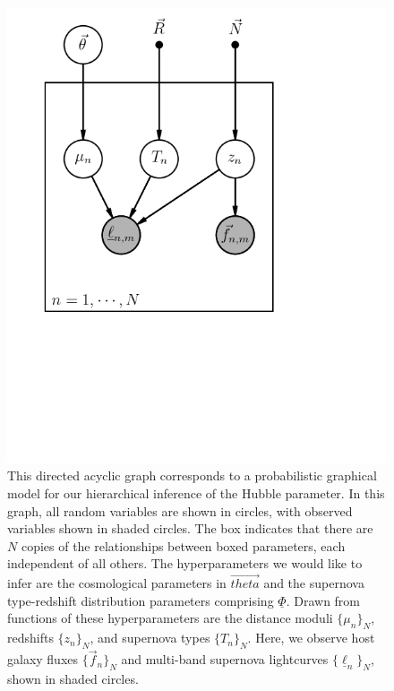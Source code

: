 \documentclass[12pt, onecolumn]{emulateapj}
\newcommand{\textul}{\underline}
\begin{document}
\vspace{1in}
\begin{figure}
\begin{center}
\includegraphics{Hubble-draft.png}
\caption{This directed acyclic graph corresponds to a probabilistic graphical model for our hierarchical inference of the Hubble parameter.  In this graph, all random variables are shown in circles, with observed variables shown in shaded circles.  The box indicates that there are $N$ copies of the relationships between boxed parameters, each independent of all others.  The hyperparameters we would like to infer are the cosmological parameters in $\vec{theta}$ and the supernova type-redshift distribution parameters comprising $\textul{\Phi}$.  Drawn from functions of these hyperparameters are the distance moduli $\{\mu_{n}\}_{N}$, redshifts $\{z_{n}\}_{N}$, and supernova types $\{T_{n}\}_{N}$.  Here, we observe host galaxy fluxes $\{\vec{f}_{n}\}_{N}$ and multi-band supernova lightcurves $\{\textul{\ell}_{n}\}_{N}$, shown in shaded circles.}
\label{fig:pgm}
\end{center}
\end{figure}
\vspace{1in}
\end{document}

